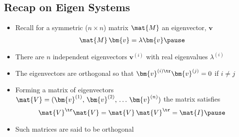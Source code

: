 \begin{slide}
\section[-1]{Recap on Eigen Systems}

\begin{PauseHighLight}
  \begin{itemize}
  \item Recall for a symmetric ($n\times n$) matrix $\mat{M}$ an
    eigenvector, $\bm{v}$
    \begin{align*}
      \mat{M} \, \bm{v} = \lambda \bm{v}\pause
    \end{align*}
  \item There are $n$ independent eigenvectors $\bm{v}^{(i)}$ with
    real eigenvalues $\lambda^{(i)}$\pause
  \item The eigenvectors are orthogonal so that
    $\bm{v}^{(i)\tr}\bm{v}^{(j)}=0$  if $i\neq j$\pause
  \item Forming a matrix of eigenvectors
    $\mat{V}=(\bm{v}^{(1)},\,\bm{v}^{(2)},\, \ldots\,\bm{v}^{(n)})$ the matrix
    satisfies
    \begin{align*}
      \mat{V}^\tr \mat{V} = \mat{V}\,\mat{V}^\tr = \mat{I}\pause
    \end{align*}
  \item Such matrices are said to be orthogonal\pause
      \end{itemize}
\end{PauseHighLight}

\end{slide}


